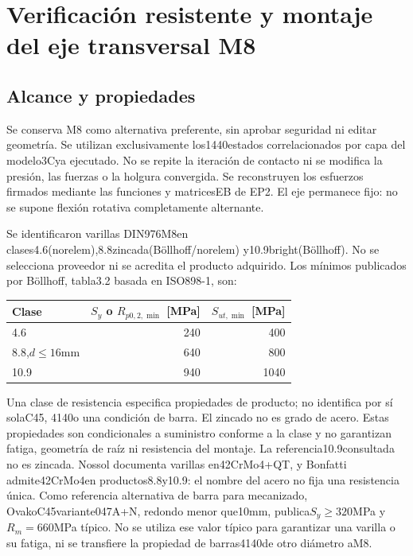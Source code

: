 \section{Verificación resistente y montaje del eje transversal M8}
\subsection{Alcance y propiedades}
Se conserva M8 como alternativa preferente, sin aprobar seguridad ni editar geometría.
Se utilizan exclusivamente los1440estados correlacionados por capa del modelo3Cya ejecutado.
No se repite la iteración de contacto ni se modifica la presión, las fuerzas o la holgura convergida.
Se reconstruyen los esfuerzos firmados mediante las funciones y matricesEB de EP2.
El eje permanece fijo: no se supone flexión rotativa completamente alternante.

Se identificaron varillas DIN976M8en clases4.6(norelem),8.8zincada(Böllhoff/norelem)
y10.9bright(Böllhoff)\parencite{boellhoff_varilla_m8_88_2026,boellhoff_varilla_m8_109_2026}.
No se selecciona proveedor ni se acredita el producto adquirido.
Los mínimos publicados por Böllhoff, tabla3.2 basada en ISO898-1\parencite{boellhoff_manual_8100_2023}, son:
\begin{center}\begin{tabular}{lrr}\toprule
Clase&$S_y$ o $R_{p0,2,\min}$ [MPa]&$S_{ut,\min}$ [MPa]\\\midrule
4.6&240&400\\8.8,$d\leq16$mm&640&800\\10.9&940&1040\\\bottomrule
\end{tabular}\end{center}
Una clase de resistencia especifica propiedades de producto; no identifica por sí solaC45,
4140o una condición de barra. El zincado no es grado de acero.
Estas propiedades son condicionales a suministro conforme a la clase y no garantizan fatiga,
geometría de raíz ni resistencia del montaje. La referencia10.9consultada no es zincada.
Nossol documenta varillas en42CrMo4+QT, y Bonfatti admite42CrMo4en productos8.8y10.9\parencite{nossol_materiales_varilla_2026,bonfatti_clases_materiales_2026}:
el nombre del acero no fija una resistencia única. Como referencia alternativa de barra
para mecanizado, OvakoC45variante047A+N, redondo menor que10mm, publica$S_y\geq320$MPa
y$R_m=660$MPa típico\parencite{ovako_C45_normalizado_2026}. No se utiliza ese valor típico para garantizar una varilla o su fatiga,
ni se transfiere la propiedad de barras4140de otro diámetro aM8.

